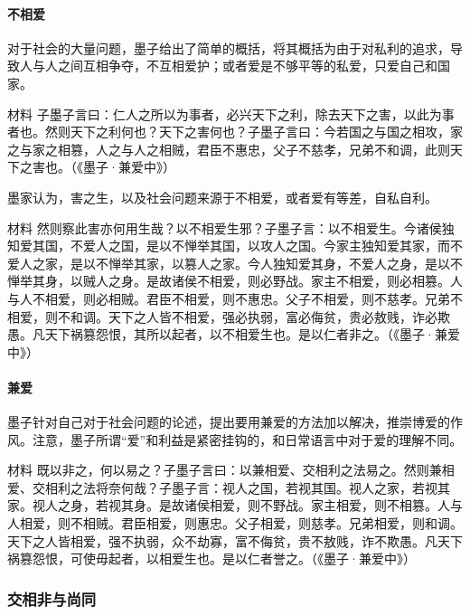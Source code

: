 \documentclass{ctexart}
\begin{document}
\paragraph{不相爱}

对于社会的大量问题，墨子给出了简单的概括，将其概括为由于对私利的追求，导致人与人之间互相争夺，不互相爱护；或者爱是不够平等的私爱，只爱自己和国家。

\begin{fancybox}{材料}
    子墨子言曰：仁人之所以为事者，必兴天下之利，除去天下之害，以此为事者也。然则天下之利何也？天下之害何也？子墨子言曰：今若国之与国之相攻，家之与家之相篡，人之与人之相贼，君臣不惠忠，父子不慈孝，兄弟不和调，此则天下之害也。（《墨子·兼爱中》）
\end{fancybox}

墨家认为，害之生，以及社会问题来源于不相爱，或者爱有等差，自私自利。

\begin{fancybox}{材料}
    然则察此害亦何用生哉？以不相爱生邪？子墨子言：以不相爱生。今诸侯独知爱其国，不爱人之国，是以不惮举其国，以攻人之国。今家主独知爱其家，而不爱人之家，是以不惮举其家，以篡人之家。今人独知爱其身，不爱人之身，是以不惮举其身，以贼人之身。是故诸侯不相爱，则必野战。家主不相爱，则必相篡。人与人不相爱，则必相贼。君臣不相爱，则不惠忠。父子不相爱，则不慈孝。兄弟不相爱，则不和调。天下之人皆不相爱，强必执弱，富必侮贫，贵必敖贱，诈必欺愚。凡天下祸篡怨恨，其所以起者，以不相爱生也。是以仁者非之。（《墨子·兼爱中》）    
\end{fancybox}

\paragraph{兼爱}

墨子针对自己对于社会问题的论述，提出要用兼爱的方法加以解决，推崇博爱的作风。注意，墨子所谓“爱”和利益是紧密挂钩的，和日常语言中对于爱的理解不同。

\begin{fancybox}{材料}
    既以非之，何以易之？子墨子言曰：以兼相爱、交相利之法易之。然则兼相爱、交相利之法将奈何哉？子墨子言：视人之国，若视其国。视人之家，若视其家。视人之身，若视其身。是故诸侯相爱，则不野战。家主相爱，则不相篡。人与人相爱，则不相贼。君臣相爱，则惠忠。父子相爱，则慈孝。兄弟相爱，则和调。天下之人皆相爱，强不执弱，众不劫寡，富不侮贫，贵不敖贱，诈不欺愚。凡天下祸篡怨恨，可使毋起者，以相爱生也。是以仁者誉之。（《墨子·兼爱中》）
\end{fancybox}

\subsubsection{交相非与尚同}
\end{document}

